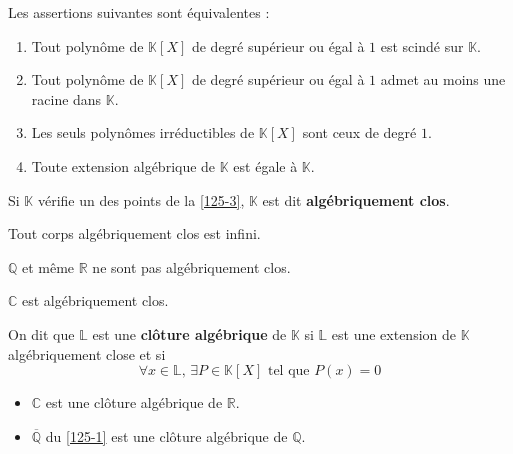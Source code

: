 
  \begin{proposition}
    \label{125-3}
    Les assertions suivantes sont équivalentes :
    \begin{enumerate}[label={\bfseries(\roman*)}]
      \item Tout polynôme de $\mathbb{K}[X]$ de degré supérieur ou égal à $1$ est scindé sur $\mathbb{K}$.
      \item Tout polynôme de $\mathbb{K}[X]$ de degré supérieur ou égal à $1$ admet au moins une racine dans $\mathbb{K}$.
      \item Les seuls polynômes irréductibles de $\mathbb{K}[X]$ sont ceux de degré $1$.
      \item Toute extension algébrique de $\mathbb{K}$ est égale à $\mathbb{K}$.
    \end{enumerate}
  \end{proposition}

  \begin{definition}
    Si $\mathbb{K}$ vérifie un des points de la \cref{125-3}, $\mathbb{K}$ est dit \textbf{algébriquement clos}.
  \end{definition}

  \begin{proposition}
    Tout corps algébriquement clos est infini.
  \end{proposition}

  \begin{cexample}
    $\mathbb{Q}$ et même $\mathbb{R}$ ne sont pas algébriquement clos.
  \end{cexample}

  \begin{theorem}
    $\mathbb{C}$ est algébriquement clos.
  \end{theorem}

  \begin{definition}
    On dit que $\mathbb{L}$ est une \textbf{clôture algébrique} de $\mathbb{K}$ si $\mathbb{L}$ est une extension de $\mathbb{K}$ algébriquement close et si
    \[ \forall x \in \mathbb{L}, \, \exists P \in \mathbb{K}[X] \text{ tel que } P(x) = 0 \]
  \end{definition}

  \begin{example}
    \begin{itemize}
      \item $\mathbb{C}$ est une clôture algébrique de $\mathbb{R}$.
      \item $\overline{\mathbb{Q}}$ du \cref{125-1} est une clôture algébrique de $\mathbb{Q}$.
    \end{itemize}
  \end{example}

